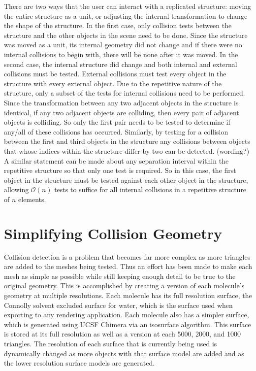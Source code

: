 \documentclass{article} %
\begin{document}
There are two ways that the user can interact with a replicated structure: moving the entire structure as a unit, or adjusting the internal transformation to change the shape of the structure.  In the first case, only collision tests between the structure and the other objects in the scene need to be done.  Since the structure was moved as a unit, its internal geometry did not change and if there were no internal collisions to begin with, there will be none after it was moved.  In the second case, the internal structure did change and both internal and external collisions must be tested.  External collisions must test every object in the structure with every external object.   Due to the repetitive nature of the structure, only a subset of the tests for internal collisions need to be performed.  Since the transformation between any two adjacent objects in the structure is identical, if any two adjacent objects are colliding, then every pair of adjacent objects is colliding.  So only the first pair needs to be tested to determine if any/all of these collisions has occurred.  Similarly, by testing for a collision between the first and third objects in the structure any collisions between objects that whose indices within the structure differ by two can be detected. (wording?)  A similar statement can be made about any separation interval within the repetitive structure so that only one test is required.  So in this case, the first object in the structure must be tested against each other object in the structure, allowing $\mathcal{O}(n)$ tests to suffice for all internal collisions in a repetitive structure of $n$ elements.

\section{Simplifying Collision Geometry}

Collision detection is a problem that becomes far more complex as more triangles are added to the meshes being tested.  Thus an effort has been made to make each mesh as simple as possible while still keeping enough detail to be true to the original geometry.  This is accomplished by creating a version of each molecule's geometry at multiple resolutions.  Each molecule has its full resolution surface, the Connolly solvent excluded surface for water, which is the surface used when exporting to any rendering application.  Each molecule also has a simpler surface, which is generated using UCSF Chimera via an isosurface algorithm.  This surface is stored at its full resolution as well as a version at each 5000, 2000, and 1000 triangles.  The resolution of each surface that is currently being used is dynamically changed as more objects with that surface model are added and as the lower resolution surface models are generated.

\end{document}
